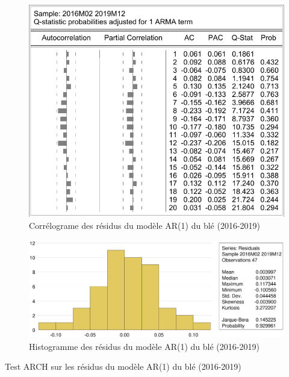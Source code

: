 \documentclass[12pt,a4paper]{article}
\begin{document}
\begin{figure}[H]
    \centering
    \includegraphics[]{annexe/4_3_1_modele_cor.pdf}
    \caption{Corrélograme des résidus du modèle AR(1) du blé (2016-2019)}
\end{figure}

\begin{figure}[H]
    \centering
    \includegraphics[width=\textwidth]{annexe/4_3_1_modele_hist.eps}
    \caption{Histogramme des résidus du modèle AR(1) du blé (2016-2019)}
\end{figure}

\begin{table}[H]
    \centering
    \caption{Test ARCH sur les résidus du modèle AR(1) du blé (2016-2019)}
    \sffamily
    \resizebox{0.6\textwidth}{!}{}
\end{table}
\end{document}
